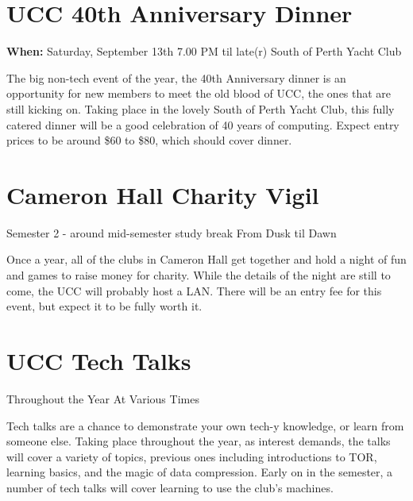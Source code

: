 \section{UCC 40th Anniversary Dinner}
{\bf When:} Saturday, September 13th
7.00 PM til late(r)
South of Perth Yacht Club

The big non-tech event of the year, the 40th Anniversary dinner is an opportunity for new members to meet the old blood of UCC, the ones that are still kicking on. Taking place in the lovely South of Perth Yacht Club, this fully catered dinner will be a good celebration of 40 years of computing. Expect entry prices to be around \$60 to \$80, which should cover dinner.

\section{Cameron Hall Charity Vigil}
Semester 2 - around mid-semester study break
From Dusk til Dawn

Once a year, all of the clubs in Cameron Hall get together and hold a night of fun and games to raise money for charity. While the details of the night are still to come, the UCC will probably host a LAN. There will be an entry fee for this event, but expect it to be fully worth it.

\section{UCC Tech Talks}
Throughout the Year
At Various Times

Tech talks are a chance to demonstrate your own tech-y knowledge, or learn from someone else. Taking place throughout the year, as interest demands, the talks will cover a variety of topics, previous ones including introductions to TOR, learning basics, and the magic of data compression. Early on in the semester, a number of tech talks will cover learning to use the club's machines.
